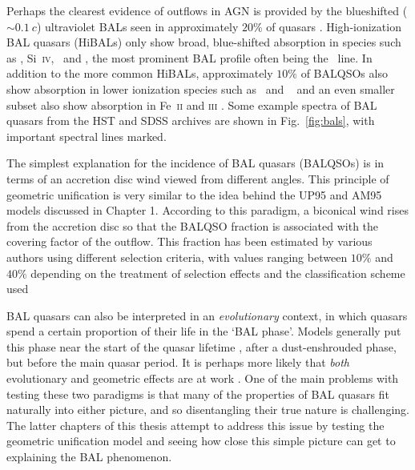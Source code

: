 Perhaps the clearest evidence of outflows in AGN is provided by  
the blueshifted ($\sim 0.1~c$) ultraviolet 
BALs seen in approximately $20\%$ of quasars
\citep{weymann1991, knigge2008, dai2008, allen2011}. 
High-ionization BAL quasars (HiBALs)
only show broad, blue-shifted absorption in species such as 
\civ, Si~\textsc{iv}, \nv\ and \ovi, the most prominent BAL
profile often being the \civline\ line.
In addition to the more common HiBALs, 
approximately $10\%$ of BALQSOs also show absorption
in lower ionization species such as \mgii\ and \aliii\ 
\citep[LoBALs;][]{voit1993,gibson2009}
and an even smaller subset also show absorption in Fe~\textsc{ii} and 
\textsc{iii} \citep[FeLoBALs;][]{becker2000,hall2002}. 
Some example spectra of BAL quasars from the HST and SDSS archives are shown in 
Fig.~\ref{fig:bals}, with important spectral lines marked.

The simplest explanation for the incidence of 
BAL quasars (BALQSOs) is in terms of an accretion disc wind viewed
from different angles. This principle of geometric unification
is very similar to the idea behind the UP95 and AM95 models discussed in Chapter 1.
According to this paradigm, a biconical wind rises from 
the accretion disc so that the BALQSO fraction is associated with
the covering factor of the outflow. This fraction
has been estimated by various authors using different 
selection criteria, with 
values ranging between $10\%$ and $40\%$ depending on the treatment 
of selection effects and the classification scheme used 
\citep{weymann1991, trump2006, knigge2008, dai2008, allen2011}

BAL quasars can also be interpreted in an {\em evolutionary}
context, in which quasars spend a certain proportion of their life
in the `BAL phase'. Models generally put this phase near the start
of the quasar lifetime 
\citep{hazard1984,surdej1987,boroson1992,zubovas2013}, 
after a dust-enshrouded phase, but before
the main quasar period. It is perhaps more likely that {\em both} 
evolutionary and geometric effects are at work \citep{borguet2010,dai2012}.
One of the main problems with testing these two paradigms is that many of
the properties of BAL quasars fit naturally into either picture, and so
disentangling their true nature is challenging. 
The latter chapters of this thesis attempt to address this issue by testing the 
geometric unification model
and seeing how close this simple picture can get to explaining 
the BAL phenomenon.  

